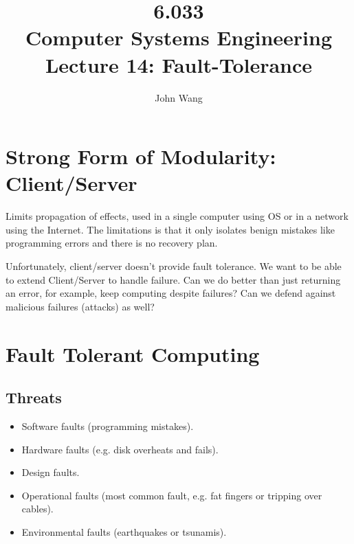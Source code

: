 \documentclass[psamsfonts]{amsart}
\title{6.033 \\
Computer Systems Engineering \\
Lecture 14: Fault-Tolerance}
\author{John Wang}
\begin{document}
\maketitle

\section{Strong Form of Modularity: Client/Server}

Limits propagation of effects, used in a single computer using OS or in a network using the Internet. The limitations is that it only isolates benign mistakes like programming errors and there is no recovery plan.

Unfortunately, client/server doesn't provide fault tolerance. We want to be able to extend Client/Server to handle failure. Can we do better than just returning an error, for example, keep computing despite failures? Can we defend against malicious failures (attacks) as well?

\section{Fault Tolerant Computing}

\subsection{Threats}

\begin{itemize}
  \item Software faults (programming mistakes).
  \item Hardware faults (e.g. disk overheats and fails).
  \item Design faults.
  \item Operational faults (most common fault, e.g. fat fingers or tripping over cables).
  \item Environmental faults (earthquakes or tsunamis).
\end{itemize}
\end{document}
